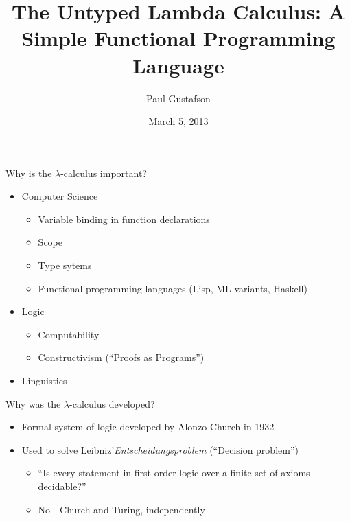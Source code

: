 \documentclass{beamer}
\title{The Untyped Lambda Calculus: A Simple Functional Programming Language}
\author{Paul Gustafson}
\institute{Math 482 - Texas A\&M University}
\date{March 5, 2013}
\begin{document}
\begin{frame}
\titlepage
\end{frame}


\begin{frame}{Why is the $\lambda$-calculus important?}
\begin{itemize}
\item Computer Science 
\begin{itemize}
\item Variable binding in function declarations
\item Scope
\item Type sytems
\item Functional programming languages (Lisp, ML variants, Haskell)
\end{itemize}
\item Logic
\begin{itemize}
\item Computability
\item Constructivism (``Proofs as Programs'')
\end{itemize}
\item Linguistics
\end{itemize}
\end{frame}

\begin{frame}{Why was the $\lambda$-calculus developed?}
\begin{itemize}
\item Formal system of logic developed by Alonzo Church in 1932
\item Used to solve Leibniz'\emph{Entscheidungsproblem} (``Decision problem'')
\begin{itemize}
\item ``Is every statement in first-order logic over a finite set of axioms decidable?''
\item No - Church and Turing, independently
\end{itemize}
\end{itemize}
\end{frame}
\end{document}
